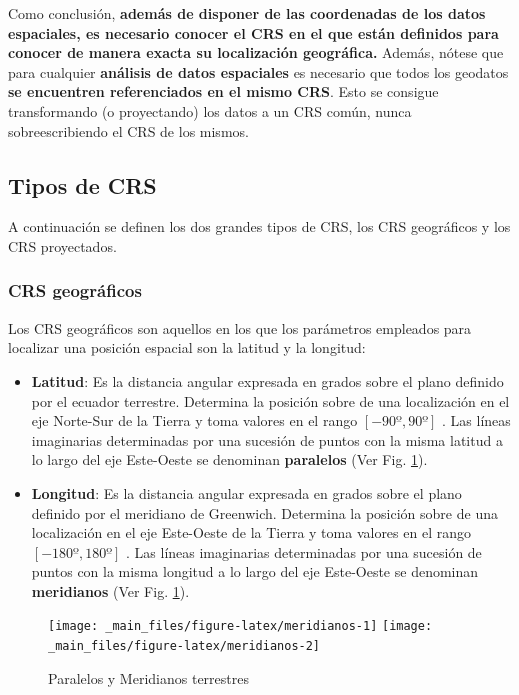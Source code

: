 \documentclass[
]{book}
\begin{document}
Como conclusión, \textbf{además de disponer de las coordenadas de los datos
espaciales, es necesario conocer el CRS en el que están definidos para conocer
de manera exacta su localización geográfica.} Además, nótese que para cualquier
\textbf{análisis de datos espaciales} es necesario que todos los geodatos \textbf{se
encuentren referenciados en el mismo CRS}. Esto se consigue transformando (o
proyectando) los datos a un CRS común, nunca sobreescribiendo el CRS de los
mismos.

\hypertarget{tipos-de-crs}{%
\subsection{Tipos de CRS}\label{tipos-de-crs}}

A continuación se definen los dos grandes tipos de CRS, los CRS geográficos y
los CRS proyectados.

\hypertarget{crs-geogruxe1ficos}{%
\subsubsection{CRS geográficos}\label{crs-geogruxe1ficos}}

Los CRS geográficos son aquellos en los que los parámetros empleados para
localizar una posición espacial son la latitud y la longitud:

\begin{itemize}
\item
  \textbf{Latitud}: Es la distancia angular expresada en grados sobre el plano
  definido por el ecuador terrestre. Determina la posición sobre de una
  localización en el eje Norte-Sur de la Tierra y toma valores en el rango
  \([-90º,90º]\) . Las líneas imaginarias determinadas por una sucesión de
  puntos con la misma latitud a lo largo del eje Este-Oeste se denominan
  \textbf{paralelos} (Ver Fig. \ref{fig:meridianos}).
\item
  \textbf{Longitud}: Es la distancia angular expresada en grados sobre el plano
  definido por el meridiano de Greenwich. Determina la posición sobre de una
  localización en el eje Este-Oeste de la Tierra y toma valores en el rango
  \([-180º,180º]\) . Las líneas imaginarias determinadas por una sucesión de
  puntos con la misma longitud a lo largo del eje Este-Oeste se denominan
  \textbf{meridianos} (Ver Fig. \ref{fig:meridianos}).
\end{itemize}

\begin{figure}

{\centering \texttt{[image: \_main\_files/figure-latex/meridianos-1]} \texttt{[image: \_main\_files/figure-latex/meridianos-2]} 

}

\caption{Paralelos y Meridianos terrestres}\label{fig:meridianos}
\end{figure}
\end{document}
